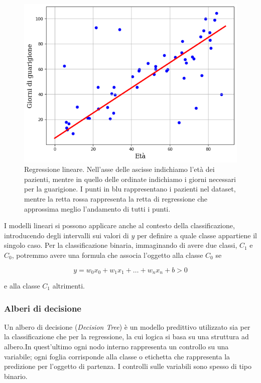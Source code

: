 \documentclass[a4paper,12pt]{report}
\begin{document}
\begin{figure}[h]
    \centering
    \includegraphics[scale=0.7]{images/regressione_lineare.png}
    \caption{Regressione lineare. Nell'asse delle ascisse indichiamo l'età dei pazienti, mentre in quello delle ordinate indichiamo i giorni necessari per la guarigione. I punti in blu rappresentano i pazienti nel dataset, mentre la retta rossa rappresenta la retta di regressione che approssima meglio l'andamento di tutti i punti.}
    \label{fig:linear_regression}

\end{figure}


I modelli lineari si possono applicare anche al contesto della classificazione, introducendo degli intervalli sui valori di $y$ per definire a quale classe appartiene il singolo caso. 
Per la classificazione binaria, immaginando di avere due classi, $C_1$ e $C_0$, potremmo avere una formula che associa l'oggetto alla classe $C_0$ se

\begin{equation*}
    y = w_0x_0 + w_1x_1 + \dots + w_nx_n + b > 0
\end{equation*}

\noindent e alla classe $C_1$ altrimenti.


\subsubsection{Alberi di decisione}

Un albero di decisione (\textit{Decision Tree}) è un modello predittivo utilizzato sia per la classificazione che per la regressione, la cui logica si basa su una struttura ad albero.In quest'ultimo ogni nodo interno rappresenta un controllo su una variabile; ogni foglia corrisponde  alla classe o etichetta che rappresenta la predizione per l'oggetto di partenza.
I controlli sulle variabili sono spesso di tipo binario.
\end{document}
